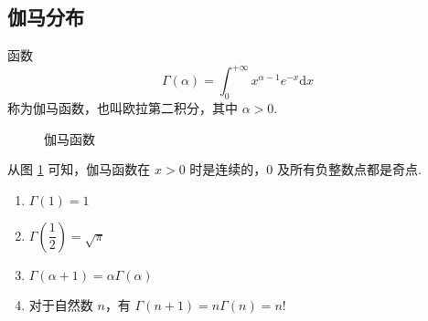 \subsection{伽马分布}

\begin{definition}
    \indent 函数
    \begin{equation} \label{equation:gamma}
        \Gamma(\alpha) = \int_{0}^{+\infty} x^{\alpha - 1} e^{-x} \text{d}x
    \end{equation}
    称为{\heiti 伽马函数}，也叫{\heiti 欧拉第二积分}，其中 $\alpha > 0$.
\end{definition}

\begin{figure}[htbp]
    \centering


    \caption{伽马函数}
    \label{fig:伽马函数}
\end{figure}

从图 \ref{fig:伽马函数} 可知，伽马函数在 $x>0$ 时是连续的，$0$ 及所有负整数点都是奇点.

\begin{property}[][伽马函数的性质]
    \begin{enumerate}
        \item $\Gamma(1) = 1$
        \item $\Gamma(\dfrac{1}{2}) = \sqrt{\pi}$
        \item $\Gamma(\alpha + 1) = \alpha \Gamma(\alpha)$
        \item 对于自然数 $n$，有 $\Gamma(n+1) = n \Gamma(n) = n!$
    \end{enumerate}
\end{property}

